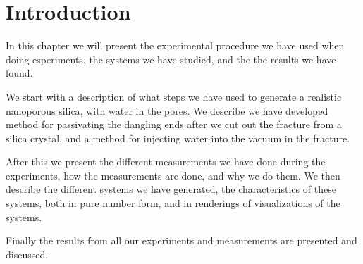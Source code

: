 \chapter{Introduction}
In this chapter we will present the experimental procedure we have used when doing esperiments, the systems we have studied, and the the results we have found. 

We start with a description of what steps we have used to generate a realistic nanoporous silica, with water in the pores. We describe we have developed method for passivating the dangling ends after we cut out the fracture from a silica crystal, and a method for injecting water into the vacuum in the fracture.

After this we present the different measurements we have done during the experiments, how the measurements are done, and why we do them. We then describe the different systems we have generated, the characteristics of these systems, both in pure number form, and in renderings of visualizations of the systems.

Finally the results from all our experiments and measurements are presented and discussed. 